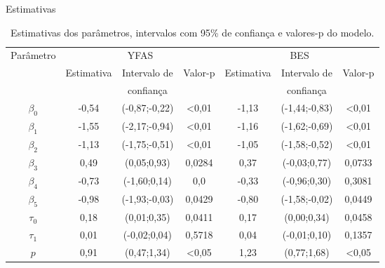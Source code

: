 \documentclass[
  ignorenonframetext,
  serif,
  professionalfont,
  usenames,
  dvipsnames,
  aspectratio = 169]{beamer}
\begin{document}
\begin{frame}{Estimativas}
\protect\hypertarget{estimativas}{}
\begin{table}[]
\centering
\begin{tabular}{c|ccc|ccc}
\hline
\multirow{3}{*}{Parâmetro} & \multicolumn{3}{c|}{YFAS}                                              & \multicolumn{3}{c}{BES}                                                \\ \cline{2-7} 
                           & \multirow{2}{*}{Estimativa} & Intervalo de  & \multirow{2}{*}{Valor-p} & \multirow{2}{*}{Estimativa} & Intervalo de  & \multirow{2}{*}{Valor-p} \\
                           &                             & confiança     &                          &                             & confiança     &                          \\ \hline
$\beta_0$                  & -0,54                       & (-0,87;-0,22) & \textless{}0,01          & -1,13                       & (-1,44;-0,83) & \textless{}0,01          \\
$\beta_1$                  & -1,55                       & (-2,17;-0,94) & \textless{}0,01          & -1,16                       & (-1,62;-0,69) & \textless{}0,01          \\
$\beta_2$                  & -1,13                       & (-1,75;-0,51) & \textless{}0,01          & -1,05                       & (-1,58;-0,52) & \textless{}0,01          \\
$\beta_3$                  & 0,49                        & (0,05;0,93)   & 0,0284                   & 0,37                        & (-0,03;0,77)  & 0,0733                   \\
$\beta_4$                  & -0,73                       & (-1,60;0,14)  & 0,0                      & -0,33                       & (-0,96;0,30)  & 0,3081                   \\
$\beta_5$                  & -0,98                       & (-1,93;-0,03) & 0,0429                   & -0,80                       & (-1,58;-0,02) & 0,0449                   \\
$\tau_0$                   & 0,18                        & (0,01;0,35)   & 0,0411                   & 0,17                        & (0,00;0,34)   & 0,0458                   \\
$\tau_1$                   & 0,01                        & (-0,02;0,04)  & 0,5718                   & 0,04                        & (-0,01;0,10)  & 0,1357                   \\
$p$                        & 0,91                        & (0,47;1,34)   & \textless{}0,05          & 1,23                        & (0,77;1,68)   & \textless{}0,05          \\ \hline
\end{tabular}
\caption{Estimativas dos parâmetros, intervalos com 95\% de confiança e valores-p do modelo.}
\label{tab:my-table}
\end{table}
\end{frame}
\end{document}
